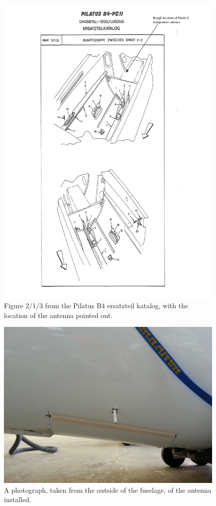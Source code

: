 \documentclass{article}
\begin{document}
\begin{figure}
\includegraphics[width=\textwidth,keepaspectratio]{b4_ersatzteil_katalog_fig_2_1_3_annotated}
\caption{Figure 2/1/3 from the Pilatus B4 ersatzteil katalog, with the location of the antenna pointed out.}
\label{fig:ersatzteil_antenna}
\end{figure}

\begin{figure}
\includegraphics[width=\textwidth,keepaspectratio]{outside}
\caption{A photograph, taken from the outside of the fuselage, of the antenna installed.}
\label{fig:outside}
\end{figure}
\end{document}

